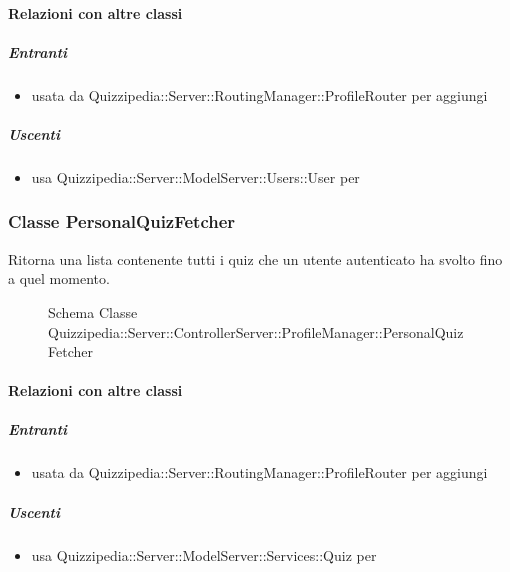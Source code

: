 \paragraph{Relazioni con altre classi}
\subparagraph{Entranti}
\begin{itemize}
\item usata da Quizzipedia::Server::RoutingManager::ProfileRouter per aggiungi
\end{itemize}
\subparagraph{Uscenti}
\begin{itemize}
\item usa Quizzipedia::Server::ModelServer::Users::User per 
\end{itemize}
\subsubsection{Classe PersonalQuizFetcher}
Ritorna una lista contenente tutti i quiz che un utente autenticato ha svolto fino a quel momento.
\begin{figure}[H]
\centering
\noindent{}
\caption[Schema Classe PersonalQuizFetcher]{Schema Classe Quizzipedia::Server::ControllerServer::ProfileManager::PersonalQuizFetcher}
\end{figure}
\paragraph{Relazioni con altre classi}
\subparagraph{Entranti}
\begin{itemize}
\item usata da Quizzipedia::Server::RoutingManager::ProfileRouter per aggiungi
\end{itemize}
\subparagraph{Uscenti}
\begin{itemize}
\item usa Quizzipedia::Server::ModelServer::Services::Quiz per 
\end{itemize}
